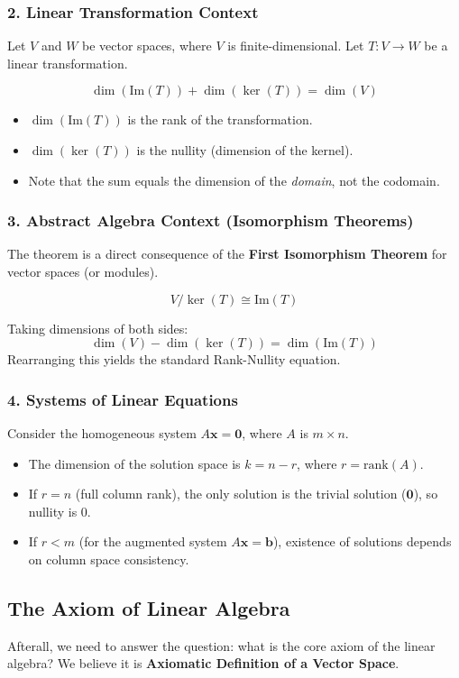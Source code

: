 \subsubsection{2. Linear Transformation Context}
Let $V$ and $W$ be vector spaces, where $V$ is finite-dimensional. Let $T: V \to W$ be a linear transformation.
\begin{theorem}
\[ \dim(\text{Im}(T)) + \dim(\ker(T)) = \dim(V) \]
\end{theorem}
\begin{itemize}
    \item $\dim(\text{Im}(T))$ is the rank of the transformation.
    \item $\dim(\ker(T))$ is the nullity (dimension of the kernel).
    \item Note that the sum equals the dimension of the \textit{domain}, not the codomain.
\end{itemize}

\subsubsection{3. Abstract Algebra Context (Isomorphism Theorems)}
The theorem is a direct consequence of the \textbf{First Isomorphism Theorem} for vector spaces (or modules).
\begin{theorem}
\[ V / \ker(T) \cong \text{Im}(T) \]
\end{theorem}
Taking dimensions of both sides:
\[ \dim(V) - \dim(\ker(T)) = \dim(\text{Im}(T)) \]
Rearranging this yields the standard Rank-Nullity equation.

\subsubsection{4. Systems of Linear Equations}
Consider the homogeneous system $A\mathbf{x} = \mathbf{0}$, where $A$ is $m \times n$.
\begin{itemize}
    \item The dimension of the solution space is $k = n - r$, where $r = \text{rank}(A)$.
    \item If $r = n$ (full column rank), the only solution is the trivial solution ($\mathbf{0}$), so nullity is 0.
    \item If $r < m$ (for the augmented system $A\mathbf{x}=\mathbf{b}$), existence of solutions depends on column space consistency.
\end{itemize}

\subsection{The Axiom of Linear Algebra}
Afterall, we need to answer the question: what is the core axiom of the linear algebra? We believe it is \textbf{Axiomatic Definition of a Vector Space}.

